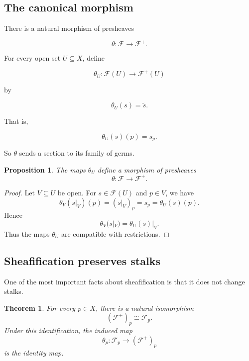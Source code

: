 \documentclass[12pt,a4paper]{article}
\theoremstyle{notespace}
\newtheorem{theorem}[definition]{Theorem}
\newtheorem{proposition}[definition]{Proposition}
\begin{document}
\subsection{The canonical morphism}
There is a natural morphism of presheaves

\[
\theta : \mathcal F \longrightarrow \mathcal F^+.
\]

For every open set $U \subseteq X$, define

\[
\theta_U : \mathcal F(U) \longrightarrow \mathcal F^+(U)
\]

by

\[
\theta_U(s)=\widetilde{s}.
\]

That is,

\[
\theta_U(s)(p)=s_p.
\]

So $\theta$ sends a section to its family of germs.

\begin{proposition}
	The maps $\theta_U$ define a morphism of presheaves
	\[
	\theta : \mathcal F \longrightarrow \mathcal F^+.
	\]
\end{proposition}

\begin{proof}
	Let $V \subseteq U$ be open.
	For $s \in \mathcal F(U)$ and $p \in V$, we have
	\[
	\theta_V(s|_V)(p)
	=
	(s|_V)_p
	=
	s_p
	=
	\theta_U(s)(p).
	\]
	Hence
	\[
	\theta_V(s|_V)=\theta_U(s)|_V.
	\]
	Thus the maps $\theta_U$ are compatible with restrictions.
\end{proof}

\subsection{Sheafification preserves stalks}
One of the most important facts about sheafification is that it does not change
stalks.

\begin{theorem}
	For every $p \in X$, there is a natural isomorphism
	\[
	(\mathcal F^+)_p \cong \mathcal F_p.
	\]
	Under this identification, the induced map
	\[
	\theta_p : \mathcal F_p \longrightarrow (\mathcal F^+)_p
	\]
	is the identity map.
\end{theorem}
\end{document}

